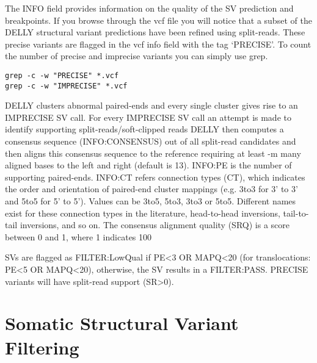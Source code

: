 \begin{steps}
\begin{note}
The INFO field provides information on the quality of the SV prediction and breakpoints. If you browse through the vcf file you will notice that a subset of the DELLY structural variant predictions have been refined using split-reads. These precise variants are flagged in the vcf info field with the tag ‘PRECISE’. To count the number of precise and imprecise variants you can simply use grep.

\end{note}

\begin{steps}
\begin{lstlisting}
grep -c -w "PRECISE" *.vcf
grep -c -w "IMPRECISE" *.vcf
\end{lstlisting}
\end{steps}


\begin{information}
DELLY clusters abnormal paired-ends and every single cluster gives rise to an IMPRECISE SV call. For every IMPRECISE SV call an attempt is made to identify supporting split-reads/soft-clipped reads DELLY then computes a consensus sequence (INFO:CONSENSUS) out of all split-read candidates and then aligns this consensus sequence to the reference requiring at least -m many aligned bases to the left and right (default is 13). INFO:PE is the number of supporting paired-ends. INFO:CT refers connection types (CT), which indicates the order and orientation of paired-end cluster mappings (e.g. 3to3 for 3' to 3' and 5to5 for 5' to 5'). Values can be 3to5, 5to3, 3to3 or 5to5. Different names exist for these connection types in the literature, head-to-head inversions, tail-to-tail inversions, and so on. The consensus alignment quality (SRQ) is a score between 0 and 1, where 1 indicates 100%

SVs are flagged as FILTER:LowQual if PE<3 OR MAPQ<20 (for translocations: PE<5 OR MAPQ<20), otherwise, the SV results in a FILTER:PASS. PRECISE variants will have split-read support (SR>0).

\end{information}

\section{Somatic Structural Variant Filtering}


\end{steps}

